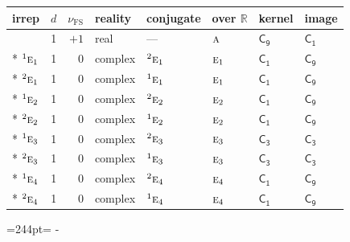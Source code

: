 \documentclass[10pt,a4paper]{article}
\newcommand{\needspace}[1]{\par\penalty-100\begingroup\dimen0=#1\relax\dimen2=\pagegoal
  \advance\dimen2-\pagetotal\ifdim\dimen0>\dimen2\relax\ifdim\dimen2>0pt\vfil\break\fi\fi
  \endgroup}
\numberwithin{equation}{section}
\newcommand{\grp}[1]{\mathsf{#1}}
\newcommand{\irr}[1]{\text{\normalfont\scshape #1}}
\newcommand{\conjpair}[1]{{}^{#1}}
\newcommand{\detbox}[1]{{\setlength{\fboxsep}{1pt}\fbox{#1}}}
\newcommand{\fsind}{\nu_{\mathrm{FS}}}
\begin{document}
{\small\renewcommand{\arraystretch}{1.25}\setlength{\tabcolsep}{4pt}\begin{longtable}{@{}lrrlllll@{}}\toprule
irrep & $d$ & $\fsind$ & reality & conjugate & over $\mathbb{R}$ & kernel & image\\\midrule\endhead
\bottomrule\endfoot\endlastfoot
\detbox{$\irr{a}$} & 1 & $+1$ & real & --- & $\irr{a}$ & \href{C9.pdf}{$\grp{C_{9}}$} & \href{../../../rotation/data/pdf/C1.pdf}{$\grp{C_{1}}$}\\*
$\conjpair{1}\irr{e}_{1}$ & 1 & $0$ & complex & $\conjpair{2}\irr{e}_{1}$ & $\irr{e}_{1}$ & \href{C1.pdf}{$\grp{C_{1}}$} & \href{../../../rotation/data/pdf/C9.pdf}{$\grp{C_{9}}$}\\*
$\conjpair{2}\irr{e}_{1}$ & 1 & $0$ & complex & $\conjpair{1}\irr{e}_{1}$ & $\irr{e}_{1}$ & \href{C1.pdf}{$\grp{C_{1}}$} & \href{../../../rotation/data/pdf/C9.pdf}{$\grp{C_{9}}$}\\*
$\conjpair{1}\irr{e}_{2}$ & 1 & $0$ & complex & $\conjpair{2}\irr{e}_{2}$ & $\irr{e}_{2}$ & \href{C1.pdf}{$\grp{C_{1}}$} & \href{../../../rotation/data/pdf/C9.pdf}{$\grp{C_{9}}$}\\*
$\conjpair{2}\irr{e}_{2}$ & 1 & $0$ & complex & $\conjpair{1}\irr{e}_{2}$ & $\irr{e}_{2}$ & \href{C1.pdf}{$\grp{C_{1}}$} & \href{../../../rotation/data/pdf/C9.pdf}{$\grp{C_{9}}$}\\*
$\conjpair{1}\irr{e}_{3}$ & 1 & $0$ & complex & $\conjpair{2}\irr{e}_{3}$ & $\irr{e}_{3}$ & \href{C3.pdf}{$\grp{C_{3}}$} & \href{../../../rotation/data/pdf/C3.pdf}{$\grp{C_{3}}$}\\*
$\conjpair{2}\irr{e}_{3}$ & 1 & $0$ & complex & $\conjpair{1}\irr{e}_{3}$ & $\irr{e}_{3}$ & \href{C3.pdf}{$\grp{C_{3}}$} & \href{../../../rotation/data/pdf/C3.pdf}{$\grp{C_{3}}$}\\*
$\conjpair{1}\irr{e}_{4}$ & 1 & $0$ & complex & $\conjpair{2}\irr{e}_{4}$ & $\irr{e}_{4}$ & \href{C1.pdf}{$\grp{C_{1}}$} & \href{../../../rotation/data/pdf/C9.pdf}{$\grp{C_{9}}$}\\*
$\conjpair{2}\irr{e}_{4}$ & 1 & $0$ & complex & $\conjpair{1}\irr{e}_{4}$ & $\irr{e}_{4}$ & \href{C1.pdf}{$\grp{C_{1}}$} & \href{../../../rotation/data/pdf/C9.pdf}{$\grp{C_{9}}$}\\
\bottomrule\end{longtable}}
\needspace{244pt}
\end{document}

